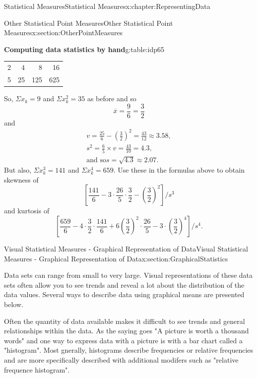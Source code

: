 \documentclass[oneside,10pt,]{book}
\numberwithin{equation}{section}
\begin{document}
\begin{chapterptx}{Statistical Measures}{}{Statistical Measures}{}{}{x:chapter:RepresentingData}
\begin{sectionptx}{Other Statistical Point Measures}{}{Other Statistical Point Measures}{}{}{x:section:OtherPointMeasures}
\begin{tableptx}{\textbf{Computing data statistics by hand}}{g:table:idp65}{}
{\begin{tabular}{rrrr}
2&4&8&16\tabularnewline[0pt]
5&25&125&625
\end{tabular}
}%
\end{tableptx}%
 So, \(\Sigma x_k = 9\) and \(\Sigma x_k^2 = 35\) as before and so%
\begin{equation*}
\overline{x} = \frac{9}{6} = \frac{3}{2}
\end{equation*}
and%
\begin{gather*}
v = \frac{25}{6} - \left ( \frac{3}{2} \right )^2 = \frac{43}{12} \approx 3.58 ,\\
s^2 = \frac{6}{5} \times v = \frac{43}{10} = 4.3,\\
\text{and so} s = \sqrt{4.3} \approx 2.07\text{.}
\end{gather*}
But also, \(\Sigma x_k^3 = 141\) and \(\Sigma x_k^4 = 659\).  Use these in the formulas above to obtain skewness of%
\begin{equation*}
\left [ \frac{141}{6} - 3 \cdot \frac{26}{5} \cdot \frac{3}{2} - \left ( \frac{3}{2} \right )^2 \right ] / s^3 
\end{equation*}
and kurtosis of%
\begin{equation*}
\left [ \frac{659}{6} - 4 \cdot \frac{3}{2} \cdot \frac{141}{6} + 6 \left ( \frac{3}{2} \right )^2  \cdot \frac{26}{5}  - 3 \cdot \left ( \frac{3}{2} \right )^4 \right ] / s^4.
\end{equation*}
%
\end{sectionptx}
%
%
\typeout{************************************************}
\typeout{************************************************}
%
\begin{sectionptx}{Visual Statistical Measures - Graphical Representation of Data}{}{Visual Statistical Measures - Graphical Representation of Data}{}{}{x:section:GraphicalStatistics}
\begin{introduction}{}%
Data sets can range from small to very large. Visual representations of these data sets often allow you to see trends and reveal a lot about the distribution of the data values. Several ways to describe data using graphical means are presented below.%
\end{introduction}%
\hypertarget{x:p:GraphicalStatisticsHistograms}{}%
 Often the quantity of data available makes it difficult to see trends and general relationships within the data. As the saying goes "A picture is worth a thousand words" and one way to express data with a picture is with a bar chart called a "histogram".  Most gnerally, histograms describe frequencies or relative frequencies and are more specifically described with additional modifers such as "relative frequence histogram".%

\end{sectionptx}
\end{chapterptx}
\end{document}
